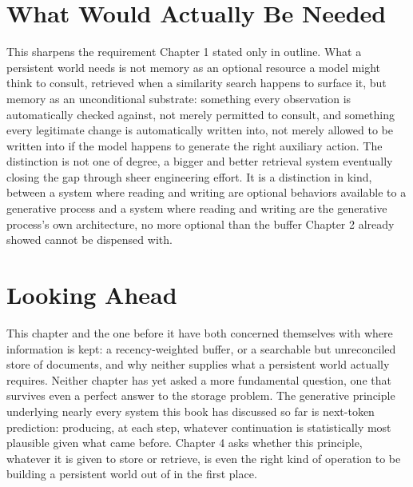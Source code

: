 \section{What Would Actually Be Needed}

This sharpens the requirement Chapter 1 stated only in outline. What a persistent world needs is not memory as an optional resource a model might think to consult, retrieved when a similarity search happens to surface it, but memory as an unconditional substrate: something every observation is automatically checked against, not merely permitted to consult, and something every legitimate change is automatically written into, not merely allowed to be written into if the model happens to generate the right auxiliary action. The distinction is not one of degree, a bigger and better retrieval system eventually closing the gap through sheer engineering effort. It is a distinction in kind, between a system where reading and writing are optional behaviors available to a generative process and a system where reading and writing are the generative process's own architecture, no more optional than the buffer Chapter 2 already showed cannot be dispensed with.

\section{Looking Ahead}

This chapter and the one before it have both concerned themselves with where information is kept: a recency-weighted buffer, or a searchable but unreconciled store of documents, and why neither supplies what a persistent world actually requires. Neither chapter has yet asked a more fundamental question, one that survives even a perfect answer to the storage problem. The generative principle underlying nearly every system this book has discussed so far is next-token prediction: producing, at each step, whatever continuation is statistically most plausible given what came before. Chapter 4 asks whether this principle, whatever it is given to store or retrieve, is even the right kind of operation to be building a persistent world out of in the first place.
